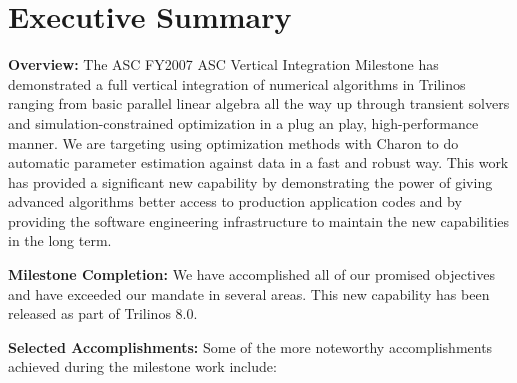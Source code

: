 \documentclass[pdf,ps2pdf,11pt]{SANDreport}
\begin{document}
%
\clearpage
\tableofcontents
\listoffigures
\listoftables



\clearpage

\section{Executive Summary}

%
%

{}\noindent\textbf{Overview:} The ASC FY2007 ASC Vertical Integration
Milestone has demonstrated a full vertical integration of numerical algorithms
in Trilinos ranging from basic parallel linear algebra all the way
up through transient solvers and simulation-constrained optimization in a plug
an play, high-performance manner.  We are targeting using optimization methods
with Charon to do automatic parameter estimation against data in a fast and
robust way.  This work has provided a significant new capability by
demonstrating the power of giving advanced algorithms better access to
production application codes and by providing the software engineering
infrastructure to maintain the new capabilities in the long term.

{}\noindent\textbf{Milestone Completion:} We have accomplished all of our
promised objectives and have exceeded our mandate in several areas.  This new
capability has been released as part of Trilinos 8.0.

{}\noindent\textbf{Selected Accomplishments:} Some of the more noteworthy
accomplishments achieved during the milestone work include:\\[0.5ex]
\end{document}

